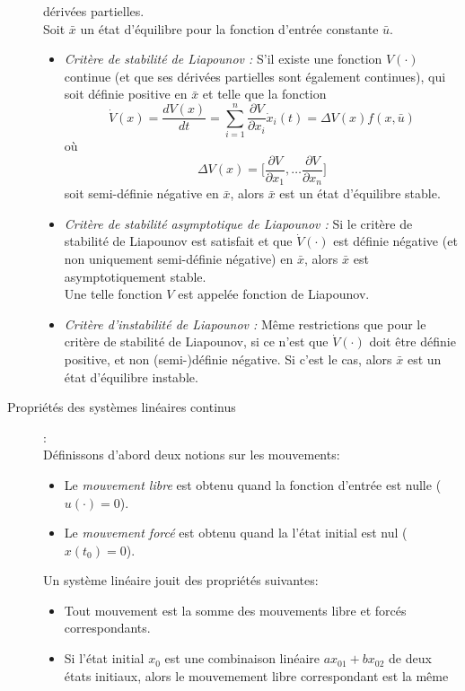 \documentclass[a4paper]{article}
\begin{document}
\begin{description}
		dérivées partielles.\\
		Soit $\bar x$ un état d'équilibre pour la fonction d'entrée constante $\bar u$.
		\begin{itemize}
			\item \emph{Critère de stabilité de Liapounov :} S'il existe une fonction
				$V(\cdot)$ continue (et que ses dérivées partielles sont également continues),
				qui soit définie positive en $\bar x$ et telle que la fonction
				\[\dot V(x)=\frac{dV(x)}{dt}
					=\sum_{i=1}^{n}\frac{\partial V}{\partial x_i}\dot x_i(t)
					=\Delta V(x)f(x,\bar u)\]
				où
				\[\Delta V(x)=\big[\frac{\partial V}{\partial x_1},\dots\frac{\partial V}{\partial x_n}\big]\]
				soit semi-définie négative en $\bar x$, alors $\bar x$ est un état d'équilibre stable.
			\item \emph{Critère de stabilité asymptotique de Liapounov :}
				Si le critère de stabilité de Liapounov est satisfait et que $\dot V(\cdot)$
				est définie négative (et non uniquement semi-définie négative) en $\bar x$,
				alors $\bar x$ est asymptotiquement stable.\\
				Une telle fonction \(V\) est appelée fonction de Liapounov.
			\item \emph{Critère d'instabilité de Liapounov :} Même restrictions
				que pour le critère de stabilité de Liapounov, si ce n'est que
				$\dot V(\cdot)$ doit être définie positive, et non
				(semi-)définie négative. Si c'est le cas, alors \(\bar x\) est
				un état d'équilibre instable.
		\end{itemize}
	\item [Propriétés des systèmes linéaires continus]:\\
		Définissons d'abord deux notions sur les mouvements:
		\begin{itemize}
			\item Le \emph{mouvement libre} est obtenu quand la fonction d'entrée est nulle ($u(\cdot)=0$).
			\item Le \emph{mouvement forcé} est obtenu quand la l'état initial est nul ($x(t_0)=0$).
		\end{itemize}
		Un système linéaire jouit des propriétés suivantes:
		\begin{itemize}
			\item Tout mouvement est la somme des mouvements libre et forcés correspondants.
			\item Si l'état initial $x_0$ est une combinaison linéaire $ax_{01} + bx_{02}$ de
				deux états initiaux, alors le mouvemement libre correspondant est la même

\end{itemize}
\end{description}
\end{document}
